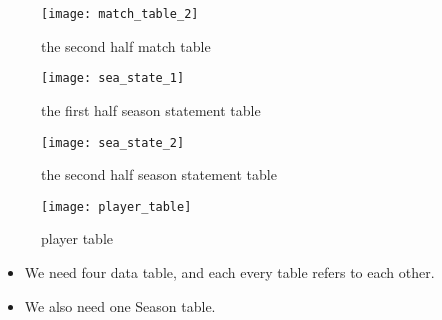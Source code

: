 \documentclass[conference,compsoc, twocolumn]{IEEEtran}
\begin{document}
\begin{figure}[h]
\centering\texttt{[image: match\_table\_2]}
\caption{the second half match table}
\end{figure}

\begin{figure}[h]
\centering\texttt{[image: sea\_state\_1]}
\caption{the first half season statement table}
\end{figure}

\begin{figure}[h]
\centering\texttt{[image: sea\_state\_2]}
\caption{the second half season statement table}
\end{figure}

\begin{figure}[h]
\centering\texttt{[image: player\_table]}
\caption{player table}
\end{figure}


\begin{itemize}
\item We need four data table, and each every table refers to each other.
\item We also need one Season table.
\end{itemize}
\end{document}
